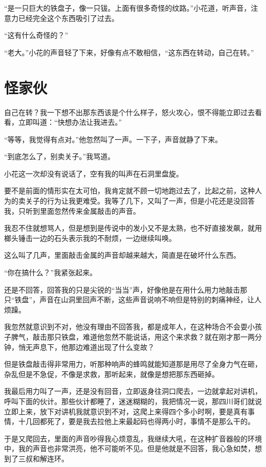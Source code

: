 “是一只巨大的铁盘子，像一只钹。上面有很多奇怪的纹路。”小花道，听声音，注意力已经完全这个东西吸引了过去。

“这有什么奇怪的？”

“老大。”小花的声音轻了下来，好像有点不敢相信，“这东西在转动，自己在转。”

\chapter{怪家伙}

自己在转？我一下想不出那东西该是个什么样子，怒火攻心，恨不得能立即过去看看，立即叫道：“快想办法让我进去。”

“等等，我觉得有点对。”他忽然叫了一声。一下子，声音就静了下来。

“到底怎么了，别卖关子。”我骂道。

小花这一次却没有说话了，空有我的叫声在石洞里盘旋。

要不是前面的情形实在太可怕，我肯定就不顾一切地跑过去了，比起之前，这种人为的卖关子的行为让我更难受。我等了几下，又叫了一声，但是小花还是没回答我，只听到里面忽然传来金属敲击的声音。

我忍不住就想骂人，但是想到是传说中的发小又不是太熟，也不好直接发飙，就用榔头锤击一边的石头表示我的不耐烦，一边继续叫唤。

这么叫了几声，里面敲击金属的声音却越来越大，简直是在破坏什么东西。

“你在搞什么？”我紧张起来。

还是不回答，回答我的只是尖锐的“当当”声，好像他是在用什么用力地敲击那只“铁盘”，声音在山洞里回声不断，这些声音说响不响但是特别的刺痛神经，让人烦躁。

我忽然就意识到不对，他没有理由不回答我，都是成年人，在这种场合不会耍小孩子脾气，敲击那只铁盘，难道他忽然不能说话，用这个来求救？就在刚才那一两分钟，悄无声息下，他那边难道出现了什么变故？

但是铁盘敲击得非常用力，听那种响声的蜂鸣就能知道那是用尽了全身力气在砸，杂乱但是不急促，不像是求救，那听起来，就像是想把那东西砸掉。

我最后用力叫了一声，还是没有回音，立即返身往洞口爬去，一边就拿起对讲机，呼叫下面的伙计。那些伙计都睡了，迷迷糊糊的，我把情况一说，那四川哥们就说立即上来，放下对讲机我就意识到不对，这爬上来得四个多小时啊，要是真有事情，十几回都死了，要是我去拉他上来最起码也得两小时，事情不是那么干的。

于是又爬回去，里面的声音吵得我心烦意乱，我继续大吼，在这种扩音器般的环境中，我的声音也非常洪亮，他不可能听不见。但是他就是不回答，我心急如焚，想到了三叔和解连环。

